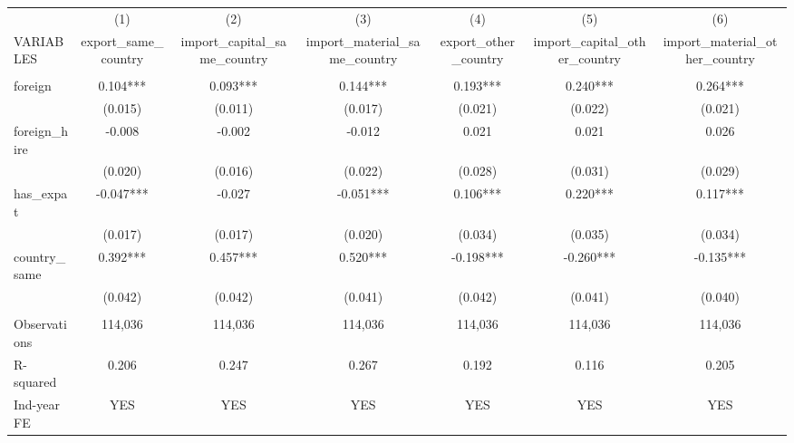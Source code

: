 \begin{tabular}{lcccccc} \hline
 & (1) & (2) & (3) & (4) & (5) & (6) \\
VARIABLES & export\_same\_country & import\_capital\_same\_country & import\_material\_same\_country & export\_other\_country & import\_capital\_other\_country & import\_material\_other\_country \\ \hline
 &  &  &  &  &  &  \\
foreign & 0.104*** & 0.093*** & 0.144*** & 0.193*** & 0.240*** & 0.264*** \\
 & (0.015) & (0.011) & (0.017) & (0.021) & (0.022) & (0.021) \\
foreign\_hire & -0.008 & -0.002 & -0.012 & 0.021 & 0.021 & 0.026 \\
 & (0.020) & (0.016) & (0.022) & (0.028) & (0.031) & (0.029) \\
has\_expat & -0.047*** & -0.027 & -0.051*** & 0.106*** & 0.220*** & 0.117*** \\
 & (0.017) & (0.017) & (0.020) & (0.034) & (0.035) & (0.034) \\
country\_same & 0.392*** & 0.457*** & 0.520*** & -0.198*** & -0.260*** & -0.135*** \\
 & (0.042) & (0.042) & (0.041) & (0.042) & (0.041) & (0.040) \\
 &  &  &  &  &  &  \\
Observations & 114,036 & 114,036 & 114,036 & 114,036 & 114,036 & 114,036 \\
R-squared & 0.206 & 0.247 & 0.267 & 0.192 & 0.116 & 0.205 \\
 Ind-year FE & YES & YES & YES & YES & YES & YES \\ \hline
\end{tabular}
